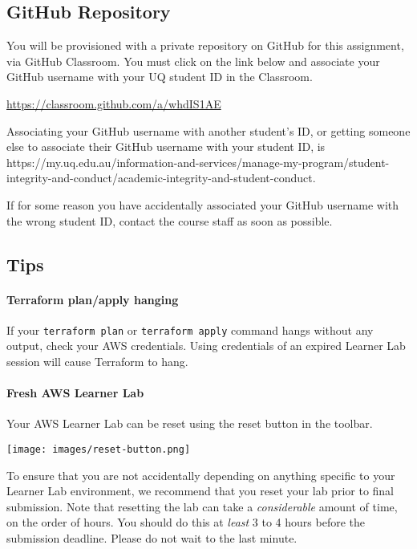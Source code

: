 \documentclass{csse4400}
\begin{document}
\subsection{GitHub Repository}\label{sec:github}
You will be provisioned with a private repository on GitHub for this assignment, via GitHub Classroom.
You must click on the link below and associate your GitHub username with your UQ student ID in the Classroom.

\url{https://classroom.github.com/a/whdIS1AE}

\noindent
Associating your GitHub username with another student's ID,
or getting someone else to associate their GitHub username with your student ID, is 
{https://my.uq.edu.au/information-and-services/manage-my-program/student-integrity-and-conduct/academic-integrity-and-student-conduct}.

If for some reason you have accidentally associated your GitHub username with the wrong student ID,
contact the course staff as soon as possible.

\subsection{Tips}

\paragraph{Terraform plan/apply hanging}
If your \texttt{terraform plan} or \texttt{terraform apply} command hangs without any output, check your AWS credentials. Using credentials of an expired Learner Lab session will cause Terraform to hang.

\paragraph{Fresh AWS Learner Lab}
Your AWS Learner Lab can be reset using the reset button in the toolbar.

\noindent
\texttt{[image: images/reset-button.png]}

\noindent
To ensure that you are not accidentally depending on anything specific to your Learner Lab environment,
we recommend that you reset your lab prior to final submission.
Note that resetting the lab can take a \textit{considerable} amount of time, on the order of hours.
You should do this at \textit{least} 3 to 4 hours before the submission deadline.
Please do not wait to the last minute.
\end{document}
